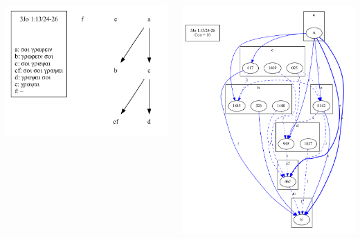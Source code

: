 \documentclass[10pt]{beamer}
\begin{document}
	\begin{frame}
		\begin{columns}
			\begin{column}{0.45\textwidth}
				\includegraphics[width=\textwidth]{../img/B25K1V13U24-26-local-stemma-incomplete.pdf}
			\end{column}
			\begin{column}{0.5\textwidth}
				\includegraphics[width=\textwidth]{../img/B25K1V13U24-26-coherence-variants-strengths.pdf}
			\end{column}
		\end{columns}
	\end{frame}
\end{document}
